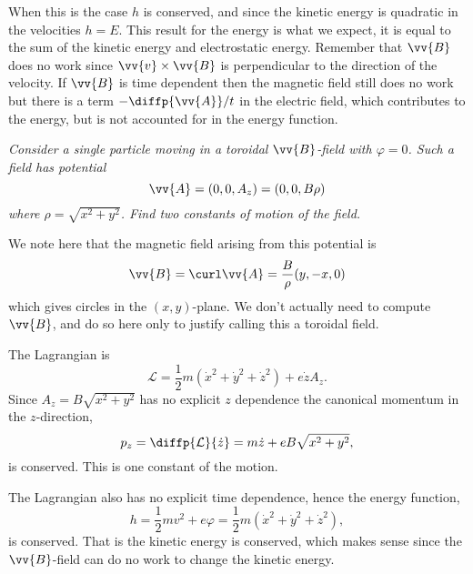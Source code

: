 \documentclass[fleqn]{NotesClass}
\newcommand*{\lagrangian}{\mathcal{L}}
\begin{document}
    When this is the case \(h\) is conserved, and since the kinetic energy is quadratic in the velocities \(h = E\).
    This result for the energy is what we expect, it is equal to the sum of the kinetic energy and electrostatic energy.
    Remember that \(\vv{B}\) does no work since \(\vv{v} \times \vv{B}\) is perpendicular to the direction of the velocity.
    If \(\vv{B}\) is time dependent then the magnetic field still does no work but there is a term \(-\diffp{\vv{A}}/{t}\) in the electric field, which contributes to the energy, but is not accounted for in the energy function.
    
    \begin{exm}{}{}
        \itshape
        Consider a single particle moving in a toroidal \(\vv{B}\)-field with \(\varphi = 0\).
        Such a field has potential
        \begin{equation}
            \vv{A} = (0, 0, A_z) = (0, 0, B\rho)
        \end{equation}
        where \(\rho = \sqrt{x^2 + y^2}\).
        Find two constants of motion of the field.
        \normalshape
        
        We note here that the magnetic field arising from this potential is
        \begin{equation}
            \vv{B} = \curl\vv{A} = \frac{B}{\rho} (y, -x, 0)
        \end{equation}
        which gives circles in the \((x, y)\)-plane.
        We don't actually need to compute \(\vv{B}\), and do so here only to justify calling this a toroidal field.
        
        The Lagrangian is
        \begin{equation}
            \lagrangian = \frac{1}{2}m(\dot{x}^2 + \dot{y}^2 + \dot{z}^2) + e\dot{z}A_z.
        \end{equation}
        Since \(A_z = B\sqrt{x^2 + y^2}\) has no explicit \(z\) dependence the canonical momentum in the \(z\)-direction,
        \begin{equation}
            p_z = \diffp{\lagrangian}{\dot{z}} = m\dot{z} + eB\sqrt{x^2 + y^2},
        \end{equation}
        is conserved.
        This is one constant of the motion.
        
        The Lagrangian also has no explicit time dependence, hence the energy function,
        \begin{equation}
            h = \frac{1}{2}mv^2 + e\varphi = \frac{1}{2}m(\dot{x}^2 + \dot{y}^2 + \dot{z}^2),
        \end{equation}
        is conserved.
        That is the kinetic energy is conserved, which makes sense since the \(\vv{B}\)-field can do no work to change the kinetic energy.
    \end{exm}
    
\end{document}
